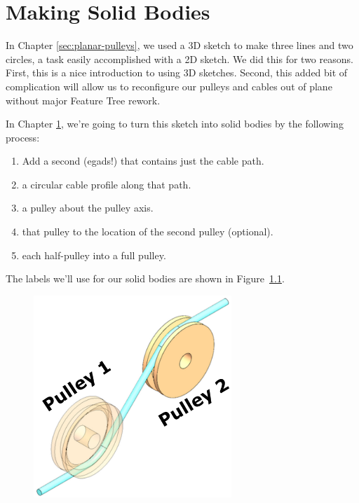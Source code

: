 \chapter{Making Solid Bodies}

\label{sec:making_solid_bodies}

In Chapter \ref{sec:planar-pulleys}, we used a 3D sketch to make three lines and
two circles, a task easily accomplished with a 2D sketch. We did this for two
reasons. First, this is a nice introduction to using 3D sketches. Second, this
added bit of complication will allow us to reconfigure our pulleys and cables
out of plane without major Feature Tree rework.

In Chapter \ref{sec:making_solid_bodies}, we're going to turn this sketch into
solid bodies by the following process:

\begin{enumerate}
  \item{} Add a second  (egads!) that contains just the cable path.
\item{}  a circular cable profile along that path.
\item{}  a pulley about the pulley axis.
\item{}   that pulley to the location of the second pulley (optional).
\item{}  each half-pulley into a full pulley.
\end{enumerate}

The labels we'll use for our solid bodies are shown in
Figure~\ref{fig:labeled-bodies}.

\begin{figure}[H]
\begin{center}
  \includegraphics[height=3in]{images/figures/completed-planar-labeled.png}
\end{center}
\caption{
\label{fig:labeled-bodies}}
\end{figure}

